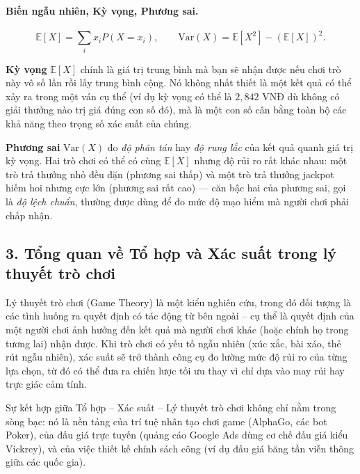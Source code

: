 \documentclass[12pt,a4paper]{article}
\theoremstyle{coloredthm}
\theoremstyle{coloreddef}
\theoremstyle{remark}
\begin{document}
\paragraph{Biến ngẫu nhiên, Kỳ vọng, Phương sai.}
\[
\mathbb{E}[X] = \sum_i x_i P(X = x_i), \qquad
\mathrm{Var}(X) = \mathbb{E}[X^2] - (\mathbb{E}[X])^2.
\]

\begin{giaithich}
\textbf{Kỳ vọng} $\mathbb{E}[X]$ chính là giá trị trung bình mà bạn sẽ nhận được nếu chơi trò này vô số lần rồi lấy trung bình cộng. Nó không nhất thiết là một kết quả có thể xảy ra trong một ván cụ thể (ví dụ kỳ vọng có thể là $2{,}842$ VNĐ dù không có giải thưởng nào trị giá đúng con số đó), mà là một con số cân bằng toàn bộ các khả năng theo trọng số xác suất của chúng.

\textbf{Phương sai} $\mathrm{Var}(X)$ đo \emph{độ phân tán} hay \emph{độ rung lắc} của kết quả quanh giá trị kỳ vọng. Hai trò chơi có thể có cùng $\mathbb{E}[X]$ nhưng độ rủi ro rất khác nhau: một trò trả thưởng nhỏ đều đặn (phương sai thấp) và một trò trả thưởng jackpot hiếm hoi nhưng cực lớn (phương sai rất cao) --- căn bậc hai của phương sai, gọi là \emph{độ lệch chuẩn}, thường được dùng để đo mức độ mạo hiểm mà người chơi phải chấp nhận.
\end{giaithich}

\subsection*{3. Tổng quan về Tổ hợp và Xác suất trong lý thuyết trò chơi}

Lý thuyết trò chơi (Game Theory) là một kiểu nghiên cứu, trong đó đối tượng là các tình huống ra quyết định có tác động từ bên ngoài -- cụ thể là quyết định của một người chơi ảnh hưởng đến kết quả mà người chơi khác (hoặc chính họ trong tương lai) nhận được. Khi trò chơi có yếu tố ngẫu nhiên (xúc xắc, bài xáo, thẻ rút ngẫu nhiên), xác suất sẽ trở thành công cụ đo lường mức độ rủi ro của từng lựa chọn, từ đó có thể đưa ra chiến lược tối ưu thay vì chỉ dựa vào may rủi hay trực giác cảm tính.

\begin{ungdung}
Sự kết hợp giữa Tổ hợp -- Xác suất -- Lý thuyết trò chơi không chỉ nằm trong sòng bạc: nó là nền tảng của trí tuệ nhân tạo chơi game (AlphaGo, các bot Poker), của đấu giá trực tuyến (quảng cáo Google Ads dùng cơ chế đấu giá kiểu Vickrey), và của việc thiết kế chính sách công (ví dụ đấu giá băng tần viễn thông giữa các quốc gia).
\end{ungdung}
\end{document}
